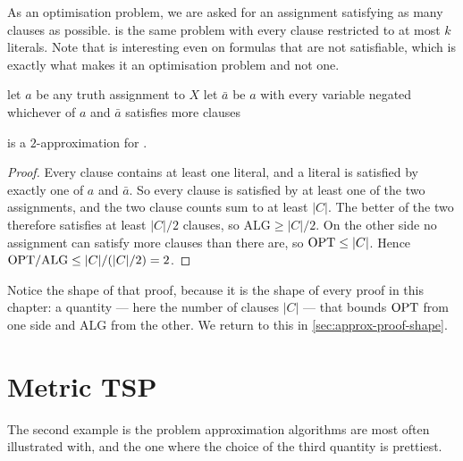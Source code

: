 As an optimisation problem, we are asked for an assignment satisfying as many
clauses as possible.  is the same problem with every clause
restricted to at most $k$ literals. Note that  is interesting
even on formulas that are not satisfiable, which is exactly what makes it an
optimisation problem and  not one.

\begin{algorithm}[ht]
\caption{$2$-approximation for }
\label{alg:maxsat}
\begin{algorithmic}[1]
  \State let $a$ be any truth assignment to $X$
  \State let $\bar a$ be $a$ with every variable negated
  \State \Return whichever of $a$ and $\bar a$ satisfies more clauses
\end{algorithmic}
\end{algorithm}

\begin{theorem}\label{thm:maxsat}
 is a $2$-approximation for .
\end{theorem}

\begin{proof}
Every clause contains at least one literal, and a literal is satisfied by
exactly one of $a$ and $\bar a$. So every clause is satisfied by at least one
of the two assignments, and the two clause counts sum to at least $|C|$. The
better of the two therefore satisfies at least $|C|/2$ clauses, so
$\mathrm{ALG} \ge |C|/2$. On the other side no assignment can satisfy more
clauses than there are, so $\mathrm{OPT} \le |C|$. Hence
$\mathrm{OPT}/\mathrm{ALG} \le |C| / (|C|/2) = 2$.
\end{proof}

Notice the shape of that proof, because it is the shape of every proof in this
chapter: a quantity --- here the number of clauses $|C|$ --- that bounds $\mathrm{OPT}$
from one side and $\mathrm{ALG}$ from the other. We return to this in
\cref{sec:approx-proof-shape}.

\section{Metric TSP}
\label{sec:metric-tsp}

The second example is the problem approximation algorithms are most often
illustrated with, and the one where the choice of the third quantity is
prettiest.


